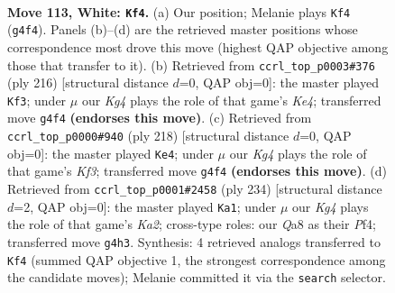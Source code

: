 \documentclass[11pt]{article}
\begin{document}
\clearpage

\begin{figure}[p]\centering
\begin{subfigure}{0.46\textwidth}\centering
\resizebox{\linewidth}{!}{%
\newchessgame
\chessboard[
  setfen={Q7/6k1/8/8/6K1/8/8/8 w - - 5 113},
  showmover=false,
  pgfstyle=straightmove, color=movearrow, markmove={g4-f4}
]}
\caption{}
\end{subfigure}\hfill
\begin{subfigure}{0.46\textwidth}\centering
\resizebox{\linewidth}{!}{%
\newchessgame
\chessboard[
  setfen={8/8/8/8/4K3/8/3Q4/6k1 w - - 6 109},
  showmover=false,
  pgfstyle=straightmove, color=movearrow, markmove={e4-f3}
]}
\caption{}
\end{subfigure}
\\[4pt]
\begin{subfigure}{0.46\textwidth}\centering
\resizebox{\linewidth}{!}{%
\newchessgame
\chessboard[
  setfen={k7/8/8/1Q6/8/5K2/8/8 w - - 5 110},
  showmover=false,
  pgfstyle=straightmove, color=movearrow, markmove={f3-e4}
]}
\caption{}
\end{subfigure}\hfill
\begin{subfigure}{0.46\textwidth}\centering
\resizebox{\linewidth}{!}{%
\newchessgame
\chessboard[
  setfen={8/8/8/8/1k3P2/8/K7/8 w - - 6 118},
  showmover=false,
  pgfstyle=straightmove, color=movearrow, markmove={a2-a1}
]}
\caption{}
\end{subfigure}
\caption{\textbf{Move 113, White: \texttt{Kf4}.} (a) Our position; Melanie plays \texttt{Kf4} (\texttt{g4f4}). Panels (b)--(d) are the retrieved master positions whose correspondence most drove this move (highest QAP objective among those that transfer to it). (b) Retrieved from \texttt{ccrl\_top\_p0003\#376} (ply 216) [structural distance $d$=0, QAP obj=0]: the master played \texttt{Kf3}; under $\mu$ our \emph{Kg4} plays the role of that game's \emph{Ke4}; transferred move \texttt{g4f4} \textbf{(endorses this move)}. (c) Retrieved from \texttt{ccrl\_top\_p0000\#940} (ply 218) [structural distance $d$=0, QAP obj=0]: the master played \texttt{Ke4}; under $\mu$ our \emph{Kg4} plays the role of that game's \emph{Kf3}; transferred move \texttt{g4f4} \textbf{(endorses this move)}. (d) Retrieved from \texttt{ccrl\_top\_p0001\#2458} (ply 234) [structural distance $d$=2, QAP obj=0]: the master played \texttt{Ka1}; under $\mu$ our \emph{Kg4} plays the role of that game's \emph{Ka2}; cross-type roles: our \emph{Q}a8 as their \emph{P}f4; transferred move \texttt{g4h3}. Synthesis: 4 retrieved analogs transferred to \texttt{Kf4} (summed QAP objective 1, the strongest correspondence among the candidate moves); Melanie committed it via the \texttt{search} selector.}
\label{fig:thought-m224}
\end{figure}
\end{document}
